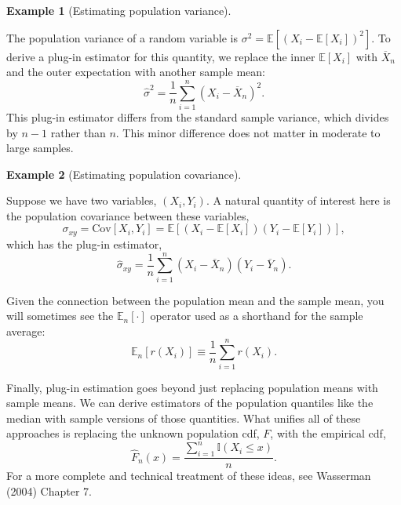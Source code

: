\documentclass[
  letterpaper,
  DIV=11,
  numbers=noendperiod]{scrreprt}
\newcommand{\E}{\mathbb{E}}
\newcommand{\Xbar}{\overline{X}}
\newcommand{\Ybar}{\overline{Y}}
\theoremstyle{definition}
\theoremstyle{plain}
\theoremstyle{definition}
\newtheorem{example}{Example}[chapter]
\theoremstyle{remark}
\begin{document}
\leavevmode{}%
\begin{example}[Estimating population variance]\label{exm-var-est}

The population variance of a random variable is
\(\sigma^2 = \E[(X_i - \E[X_i])^2]\). To derive a plug-in estimator for
this quantity, we replace the inner \(\E[X_i]\) with \(\Xbar_n\) and the
outer expectation with another sample mean: \[
\widehat{\sigma}^2 = \frac{1}{n} \sum_{i=1}^n (X_i - \Xbar_n)^2.
\] This plug-in estimator differs from the standard sample variance,
which divides by \(n - 1\) rather than \(n\). This minor difference does
not matter in moderate to large samples.

\end{example}

\leavevmode{}%
\begin{example}[Estimating population covariance]\label{exm-cov-est}

Suppose we have two variables, \((X_i, Y_i)\). A natural quantity of
interest here is the population covariance between these variables, \[
\sigma_{xy} = \text{Cov}[X_i,Y_i] = \E[(X_i - \E[X_i])(Y_i-\E[Y_i])],
\] which has the plug-in estimator, \[
\widehat{\sigma}_{xy} = \frac{1}{n} \sum_{i=1}^n (X_i - \Xbar_n)(Y_i - \Ybar_n).
\]

\end{example}

\begin{tcolorbox}[enhanced jigsaw, title=\textcolor{quarto-callout-note-color}{\faInfo}\hspace{0.5em}{Notation alert}, breakable, titlerule=0mm, opacityback=0, rightrule=.15mm, bottomrule=.15mm, colframe=quarto-callout-note-color-frame, coltitle=black, colbacktitle=quarto-callout-note-color!10!white, bottomtitle=1mm, toptitle=1mm, colback=white, arc=.35mm, opacitybacktitle=0.6, toprule=.15mm, leftrule=.75mm, left=2mm]

Given the connection between the population mean and the sample mean,
you will sometimes see the \(\E_n[\cdot]\) operator used as a shorthand
for the sample average: \[
\E_n[r(X_i)] \equiv \frac{1}{n} \sum_{i=1}^n r(X_i).
\]

\end{tcolorbox}

Finally, plug-in estimation goes beyond just replacing population means
with sample means. We can derive estimators of the population quantiles
like the median with sample versions of those quantities. What unifies
all of these approaches is replacing the unknown population cdf, \(F\),
with the empirical cdf, \[
\widehat{F}_n(x) = \frac{\sum_{i=1}^n \mathbb{I}(X_i \leq x)}{n}.
\] For a more complete and technical treatment of these ideas, see
Wasserman (2004) Chapter 7.
\end{document}

